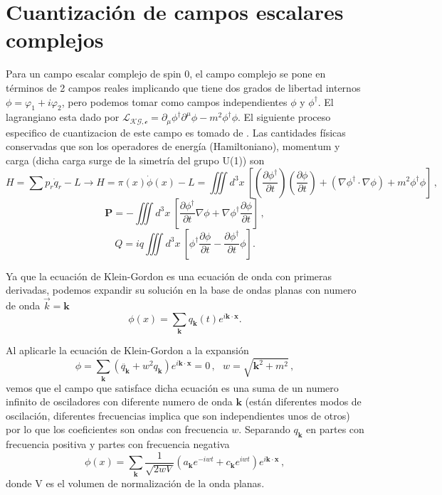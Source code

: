 \documentclass{article}
\begin{document}
\section{Cuantización de campos escalares complejos}
Para un campo escalar complejo de spin $0$, el campo complejo se pone en términos de 2 campos reales implicando que tiene dos grados de libertad internos $\phi =\varphi_1 + i\varphi_2$, pero podemos tomar como campos independientes $\phi$ y  $\phi^\dagger$. El lagrangiano esta dado por $\mathscr{L_{KG,c}}=\partial_\mu \phi^\dagger \partial^\mu \phi - m^2 \phi^\dagger \phi$. El siguiente proceso especifico de cuantizacion de este campo es tomado de \cite{Nagashima:2010}.
Las cantidades físicas conservadas que son los operadores de energía (Hamiltoniano), momentum y carga (dicha carga surge de la simetría del grupo U(1)) son
%
\begin{equation}
  H= \sum p_r\dot{q}_r - L \rightarrow H=\pi(x) \dot{\phi} (x) - L = \iiint  d^3x \  [(\frac{\partial \phi^\dagger}{\partial t})(\frac{\partial \phi}{\partial t})+(\nabla \phi^\dagger \cdot \nabla \phi) + m^2 \phi^\dagger \phi]\,,
\end{equation}
\begin{equation}
  \mathbf{P}=-\iiint  d^3x \  [\frac{\partial \phi^\dagger}{\partial t} \nabla \phi +
  \nabla \phi^\dagger \frac{\partial \phi}{\partial t}]\,,
\end{equation}
\begin{equation}
  Q= i q \iiint  d^3x \  [ \phi^\dagger \frac{\partial \phi }{\partial t} - \frac{\partial \phi^\dagger }{\partial t}\phi].
\end{equation}

Ya que la ecuación de Klein-Gordon es una ecuación de onda con primeras derivadas, podemos expandir su solución  en la base de ondas planas con numero de onda $\overrightarrow{k}=\mathbf{k}$ 
%
\begin{equation}
  \phi(x) = \sum_{\mathbf{k}} q_{\mathbf{k}}(t) e^{i\mathbf{k} \cdot \mathbf{x}}.
\end{equation}

Al aplicarle la ecuación de Klein-Gordon a la expansión 
%
\begin{equation}
  [\partial_\mu \partial^\mu + m^2] \phi = \sum_{\mathbf{k}} (\ddot{q_{\mathbf{k}}} + w^2q_{\mathbf{k}}) e^{i\mathbf{k} \cdot \mathbf{x}} = 0\,, \ \ \ w=\sqrt{\mathbf{k}^2+m^2}\,,
\end{equation}
%
vemos que el campo que satisface dicha ecuación es una suma de un numero infinito de osciladores con diferente numero de onda $\mathbf{k}$ (están diferentes modos de oscilación, diferentes frecuencias implica que son independientes unos de otros) por lo que los coeficientes son ondas con frecuencia $w$. Separando $q_\mathbf{k}$ en partes con frecuencia positiva y partes con frecuencia negativa
%
\begin{equation}
  \phi(x) = \sum_{\mathbf{k}} \frac{1}{\sqrt{2wV}} (a_{\mathbf{k}}e^{-iwt}+c_{\mathbf{k}}e^{iwt}) e^{i\mathbf{k} \cdot \mathbf{x}}\,,
\end{equation}
donde V es el volumen de normalización de la onda planas.
\end{document}
